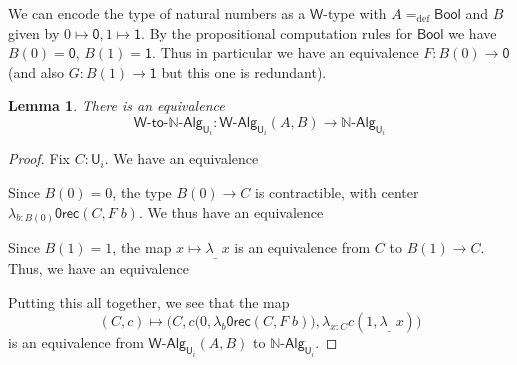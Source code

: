 \documentclass[reqno,10pt,a4paper,oneside]{amsart}
\newcommand{\prd}[1]{\Pi_{#1}}
\newcommand{\lam}[1]{\lambda_{#1}}
\newcommand{\defeq}{=_{\mathrm{def}}}
\newcommand{\nat}{\ensuremath{\mathbb{N}}}
\newcommand{\W}{\mathsf{W}}
\newcommand{\Bool}{\mathsf{Bool}}
\newcommand{\one}{\mathsf{1}}
\newcommand{\zero}{\mathsf{0}}
\newcommand{\UU}{\mathsf{U}}
\newcommand{\NatAlg}{\nat\text{-}\mathsf{Alg}}
\newcommand{\WAlgToNatAlg}{\W\text{-}\mathsf{to}\text{-}\nat\text{-}\mathsf{Alg}}
\newcommand{\WAlg}{\mathsf{W}\text{-}\mathsf{Alg}}
\newcommand{\abort}{\mathsf{0rec}}
\numberwithin{equation}{section}
\theoremstyle{mythm}
\newtheorem{lemma}[theorem]{Lemma}
\theoremstyle{mydef}
\theoremstyle{myrmk}
\begin{document}
We can encode the type of natural numbers as a $\W$-type with $A \defeq \Bool$ and $B$ given by $0 \mapsto \zero, 1 \mapsto \one$. By the propositional computation rules for $\Bool$ we have $B(0) = \zero$, $B(1) = \one$. Thus in particular we have an equivalence $F : B(0) \to \zero$ (and also $G : B(1) \to \one$ but this one is redundant).
\begin{lemma}
There is an equivalence
\[ \WAlgToNatAlg_{\UU_i} : \WAlg_{\UU_i}(A,B) \to \NatAlg_{\UU_i} \]
\end{lemma}
\begin{proof}
Fix $C : \UU_i$. We have an equivalence
\begin{center}
\end{center}
Since $B(0) = 0$, the type $B(0) \to C$ is contractible, with center $\lam{b:B(0)} \abort(C,F \; b)$. We thus have an equivalence
\begin{center}
\end{center}
Since $B(1) = 1$, the map $x \mapsto \lam{\_}\; x$ is an equivalence from $C$ to $B(1) \to C$. Thus, we have an equivalence
\begin{center}
\end{center}
Putting this all together, we see that the map 
\[ (C,c) \mapsto \Big(C,c\big(0,\lam{b} \abort(C,F \; b)\big),\lam{x:C} c(1, \lam{\_} \; x)\Big)\] 
is an equivalence from $\WAlg_{\UU_i}(A,B)$ to $\NatAlg_{\UU_i}$.
\end{proof}
\end{document}
